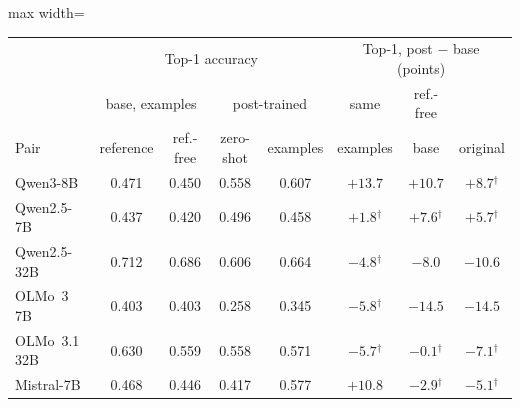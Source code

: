 \documentclass[11pt]{article}
\begin{document}
\begin{table}[t]
\centering\small
\begin{adjustbox}{max width=\linewidth}
\begin{tabular}{lccccccc}
\toprule
 & \multicolumn{4}{c}{Top-1 accuracy} & \multicolumn{3}{c}{Top-1, post $-$ base (points)} \\
 & \multicolumn{2}{c}{base, examples} & \multicolumn{2}{c}{post-trained} & same & ref.-free & \\
Pair & reference & ref.-free & zero-shot & examples & examples & base & original \\
\midrule
Qwen3-8B & 0.471 & 0.450 & 0.558 & 0.607 & $+13.7$ & $+10.7$ & $+8.7$$^{\dagger}$ \\
Qwen2.5-7B & 0.437 & 0.420 & 0.496 & 0.458 & $+1.8$$^{\dagger}$ & $+7.6$$^{\dagger}$ & $+5.7$$^{\dagger}$ \\
Qwen2.5-32B & 0.712 & 0.686 & 0.606 & 0.664 & $-4.8$$^{\dagger}$ & $-8.0$ & $-10.6$ \\
OLMo~3 7B & 0.403 & 0.403 & 0.258 & 0.345 & $-5.8$$^{\dagger}$ & $-14.5$ & $-14.5$ \\
OLMo~3.1 32B & 0.630 & 0.559 & 0.558 & 0.571 & $-5.7$$^{\dagger}$ & $-0.1$$^{\dagger}$ & $-7.1$$^{\dagger}$ \\
Mistral-7B & 0.468 & 0.446 & 0.417 & 0.577 & $+10.8$ & $-2.9$$^{\dagger}$ & $-5.1$$^{\dagger}$ \\
\bottomrule
\end{tabular}
\end{adjustbox}


\end{table}
\end{document}
